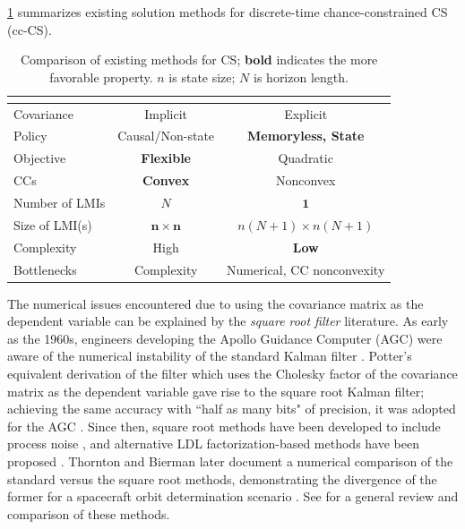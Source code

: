 \cref{tab:comparison} summarizes existing solution methods for discrete-time chance-constrained CS (cc-CS).
\begin{table}[t]
\caption{Comparison of existing methods for CS; \textbf{bold} indicates the more favorable property. $n$ is state size; $N$ is horizon length.}
\centering
\begin{tabular}{lcc}
\toprule
& \cite{skafDesignAffineControllers2010,okamotoOptimalCovarianceControl2018,okamotoOptimalStochasticVehicle2019}& \cite{liuOptimalCovarianceSteering2025,rapakouliasDiscreteTimeOptimalCovariance2023,
pilipovskyComputationallyEfficientChance2024}   \\
\midrule
Covariance & Implicit & Explicit\\
Policy & Causal/Non-state & \textbf{Memoryless, State} \\
Objective & \textbf{Flexible} & Quadratic \\
CCs & \textbf{Convex} & Nonconvex \\
Number of LMIs \cite{rapakouliasDiscreteTimeOptimalCovariance2023} & $N$ & $\mathbf{1}$ \\
Size of LMI(s) \cite{rapakouliasDiscreteTimeOptimalCovariance2023} & $\mathbf{n\times n}$ & $ n (N{+}1) \times n (N{+}1)$ \\
Complexity & High & \textbf{Low} \\
\midrule
Bottlenecks & Complexity & Numerical, CC nonconvexity\\
\bottomrule
\end{tabular}
\label{tab:comparison}
\end{table}

The numerical issues encountered due to using the covariance matrix as the dependent variable can be explained by the \textit{square root filter} literature. As early as the 1960s, engineers developing the Apollo Guidance Computer (AGC) were aware of the numerical instability of the standard Kalman filter \cite{grewalApplicationsKalmanFiltering2010}. Potter's equivalent derivation of the filter which uses the Cholesky factor of the covariance matrix as the dependent variable gave rise to the square root Kalman filter; achieving the same accuracy with ``half as many bits" of precision, it was adopted for the AGC \cite{grewalApplicationsKalmanFiltering2010}. Since then, square root methods have been developed to include process noise \cite{dyerExtensionSquarerootFiltering1969}, and alternative LDL factorization-based methods have been proposed \cite{thorntonGramSchmidtAlgorithmsCovariance1975}. Thornton and Bierman later document a numerical comparison of the standard versus the square root methods, demonstrating the divergence of the former for a spacecraft orbit determination scenario \cite{thorntonNumericalComparisonDiscrete1976}. See \cite{kaminskiDiscreteSquareRoot1971,tapleyStatisticalOrbitDetermination2004} for a general review and comparison of these methods.

